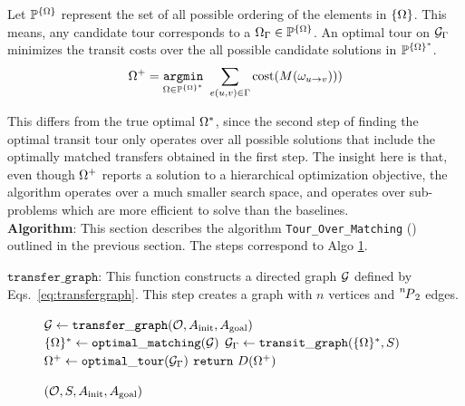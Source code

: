 Let $ \mathbb{P}^{\scomaset} $ represent the set of all possible ordering of the elements in $ \scomaset $. This means, any candidate tour corresponds to a $ \scoma_\tour\in\mathbb{P}^{\scomaset} $. An optimal tour on $ \tspgraph $ minimizes the transit costs over the all possible candidate solutions in  $ \mathbb{P}^{\scomaset^*} $.
\vspace{-0.1in}
\begin{equation}
\scoma^+ = \underset{ \scoma \in  \mathbb{P}^{\scomaset^*}   }{ \mathtt{argmin} } \ \sum_{e(u,v)\in\tour}\cost({M}( \coma_{u\rightarrow v} ))  )
\vspace{-0.05in}
\end{equation}

This differs from the true optimal $ \scoma^* $, since the second step of finding the optimal transit tour only operates over all possible solutions that include the optimally matched transfers obtained in the first step.
The insight here is that, even though $ \scoma^+ $ reports a solution to a hierarchical optimization objective, the algorithm operates over a much smaller search space, and operates over sub-problems which are more efficient to solve than the baselines.\\

\noindent\textbf{Algorithm}: This section describes the algorithm {\tt {Tour\_Over\_Matching}} (\algo) outlined in the previous section. The steps correspond to Algo \ref{algo:tom}. 

\noindent $ \mathtt{transfer\_graph} $: This function constructs a directed graph $ \graph $ defined by Eqs.~\ref{eq:transfergraph}. This step creates a graph with $ n $ vertices and $ \permu[n]{2} $ edges.

\begin{figure}\vspace{-0.3in}
  \begin{minipage}{0.6\textwidth}
  \vspace{0pt} 
    \begin{algorithm}[H]
    \caption{{\tt \algo}$ (\objectset, \startq, \ainit, \atarget) $}
    \label{algo:tom}
    $ \graph \leftarrow \mathtt{transfer\_graph}(\objectset, \ainit, \atarget) $\;
    $ \scomaset^* \leftarrow \mathtt{optimal\_matching}(\graph) $\;
    $ \tspgraph \leftarrow \mathtt{transit\_graph}(\scomaset^*, \startq) $\;
    $ \scoma^+\leftarrow\mathtt{optimal\_tour}(\tspgraph) $\;
    $ \mathbf{\mathtt{return}}\ \trajset(\scoma^+)$\;
    \end{algorithm}
  \end{minipage}
  \vspace{-0.3in}
\end{figure}

